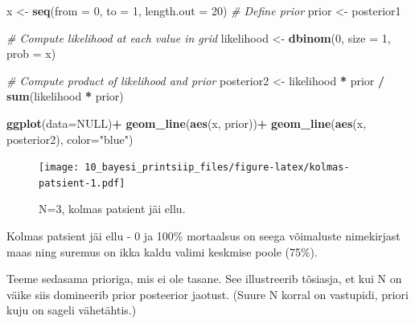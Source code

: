 \documentclass[]{book}
\newenvironment{Shaded}{\begin{snugshade}}{\end{snugshade}}
\newcommand{\KeywordTok}[1]{\textcolor[rgb]{0.13,0.29,0.53}{\textbf{#1}}}
\newcommand{\DataTypeTok}[1]{\textcolor[rgb]{0.13,0.29,0.53}{#1}}
\newcommand{\DecValTok}[1]{\textcolor[rgb]{0.00,0.00,0.81}{#1}}
\newcommand{\StringTok}[1]{\textcolor[rgb]{0.31,0.60,0.02}{#1}}
\newcommand{\CommentTok}[1]{\textcolor[rgb]{0.56,0.35,0.01}{\textit{#1}}}
\newcommand{\OtherTok}[1]{\textcolor[rgb]{0.56,0.35,0.01}{#1}}
\newcommand{\OperatorTok}[1]{\textcolor[rgb]{0.81,0.36,0.00}{\textbf{#1}}}
\newcommand{\NormalTok}[1]{#1}
\begin{document}
\begin{Shaded}
\begin{Highlighting}[]
\NormalTok{x <-}\StringTok{ }\KeywordTok{seq}\NormalTok{(}\DataTypeTok{from =} \DecValTok{0}\NormalTok{, }\DataTypeTok{to =} \DecValTok{1}\NormalTok{, }\DataTypeTok{length.out =} \DecValTok{20}\NormalTok{)}
\CommentTok{# Define prior}
\NormalTok{prior <-}\StringTok{ }\NormalTok{posterior1}

\CommentTok{# Compute likelihood at each value in grid}
\NormalTok{likelihood <-}\StringTok{ }\KeywordTok{dbinom}\NormalTok{(}\DecValTok{0}\NormalTok{, }\DataTypeTok{size =} \DecValTok{1}\NormalTok{, }\DataTypeTok{prob =}\NormalTok{ x)}

\CommentTok{# Compute product of likelihood and prior}
\NormalTok{posterior2 <-}\StringTok{ }\NormalTok{likelihood }\OperatorTok{*}\StringTok{ }\NormalTok{prior }\OperatorTok{/}\StringTok{ }\KeywordTok{sum}\NormalTok{(likelihood }\OperatorTok{*}\StringTok{ }\NormalTok{prior)}

\KeywordTok{ggplot}\NormalTok{(}\DataTypeTok{data=}\OtherTok{NULL}\NormalTok{)}\OperatorTok{+}
\StringTok{  }\KeywordTok{geom_line}\NormalTok{(}\KeywordTok{aes}\NormalTok{(x, prior))}\OperatorTok{+}
\StringTok{  }\KeywordTok{geom_line}\NormalTok{(}\KeywordTok{aes}\NormalTok{(x, posterior2), }\DataTypeTok{color=}\StringTok{"blue"}\NormalTok{)}
\end{Highlighting}
\end{Shaded}

\begin{figure}
\centering
\texttt{[image: 10\_bayesi\_printsiip\_files/figure-latex/kolmas-patsient-1.pdf]}
\caption{\label{fig:kolmas-patsient}N=3, kolmas patsient jäi ellu.}
\end{figure}

Kolmas patsient jäi ellu - 0 ja 100\% mortaalsus on seega võimaluste
nimekirjast maas ning suremus on ikka kaldu valimi keskmise poole
(75\%).

Teeme sedasama prioriga, mis ei ole tasane. See illustreerib tõsiasja,
et kui N on väike siis domineerib prior posteerior jaotust. (Suure N
korral on vastupidi, priori kuju on sageli vähetähtis.)
\end{document}
